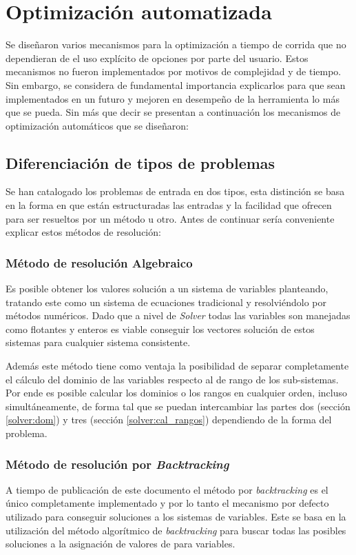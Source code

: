 \section{Optimización automatizada}
Se diseñaron varios mecanismos para la optimización a tiempo de corrida que
no dependieran de el uso explícito de opciones por parte del usuario. Estos
mecanismos no fueron implementados por motivos de complejidad y de tiempo. Sin
embargo, se considera de fundamental importancia explicarlos para que sean
implementados en un futuro y mejoren en desempeño de la herramienta lo más que
se pueda. Sin más que decir se presentan a continuación los mecanismos de optimización
automáticos que se diseñaron:

\subsection{Diferenciación de tipos de problemas}
Se han catalogado los problemas de entrada en dos tipos, esta distinción se
basa en la forma en que están estructuradas las entradas y la facilidad que 
ofrecen para ser resueltos por un método u otro. Antes de continuar sería 
conveniente explicar estos métodos de resolución:

\subsubsection{Método de resolución Algebraico}
Es posible obtener los valores solución a un sistema de variables
planteando, tratando este como un sistema de ecuaciones tradicional y resolviéndolo
por métodos numéricos. Dado que a nivel de \emph{Solver} todas las variables
son manejadas como flotantes y enteros es viable conseguir los vectores
solución de estos sistemas para cualquier sistema consistente.

Además este método tiene como ventaja la posibilidad de separar
completamente el cálculo del dominio de las variables respecto al de rango
de los sub-sistemas. Por ende es posible calcular los dominios o
los rangos en cualquier orden, incluso simultáneamente, de forma tal que
se puedan intercambiar las partes dos (sección \ref{solver:dom}) y tres 
(sección \ref{solver:cal_rangos}) dependiendo de la forma del problema.

\subsubsection{Método de resolución por \emph{Backtracking}}
A tiempo de publicación de este documento el método por \emph{backtracking}
es el único completamente implementado y por lo tanto el mecanismo
por defecto utilizado para conseguir soluciones a los sistemas de variables.
Este se basa en la utilización del método algorítmico de \emph{backtracking} para
buscar todas las posibles soluciones a la asignación de valores de para
variables.

